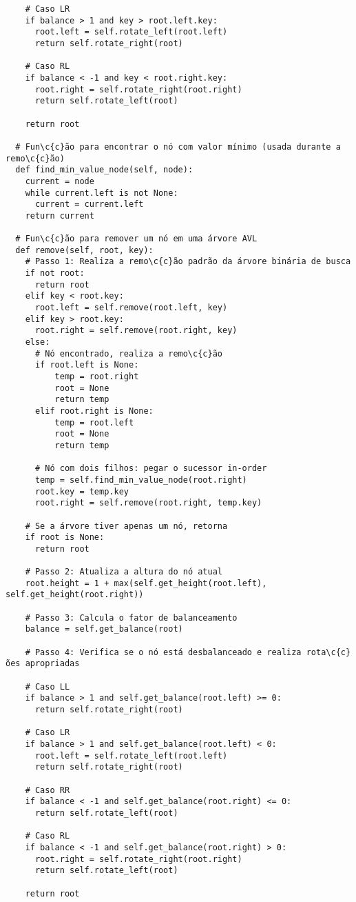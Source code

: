 \documentclass{article}
\begin{document}
\begin{lstlisting}
    # Caso LR
    if balance > 1 and key > root.left.key:
      root.left = self.rotate_left(root.left)
      return self.rotate_right(root)

    # Caso RL
    if balance < -1 and key < root.right.key:
      root.right = self.rotate_right(root.right)
      return self.rotate_left(root)

    return root

  # Fun\c{c}ão para encontrar o nó com valor mínimo (usada durante a remo\c{c}ão)
  def find_min_value_node(self, node):
    current = node
    while current.left is not None:
      current = current.left
    return current

  # Fun\c{c}ão para remover um nó em uma árvore AVL
  def remove(self, root, key):
    # Passo 1: Realiza a remo\c{c}ão padrão da árvore binária de busca
    if not root:
      return root
    elif key < root.key:
      root.left = self.remove(root.left, key)
    elif key > root.key:
      root.right = self.remove(root.right, key)
    else:
      # Nó encontrado, realiza a remo\c{c}ão
      if root.left is None:
          temp = root.right
          root = None
          return temp
      elif root.right is None:
          temp = root.left
          root = None
          return temp

      # Nó com dois filhos: pegar o sucessor in-order
      temp = self.find_min_value_node(root.right)
      root.key = temp.key
      root.right = self.remove(root.right, temp.key)

    # Se a árvore tiver apenas um nó, retorna
    if root is None:
      return root

    # Passo 2: Atualiza a altura do nó atual
    root.height = 1 + max(self.get_height(root.left), self.get_height(root.right))

    # Passo 3: Calcula o fator de balanceamento
    balance = self.get_balance(root)

    # Passo 4: Verifica se o nó está desbalanceado e realiza rota\c{c}ões apropriadas

    # Caso LL
    if balance > 1 and self.get_balance(root.left) >= 0:
      return self.rotate_right(root)

    # Caso LR
    if balance > 1 and self.get_balance(root.left) < 0:
      root.left = self.rotate_left(root.left)
      return self.rotate_right(root)

    # Caso RR
    if balance < -1 and self.get_balance(root.right) <= 0:
      return self.rotate_left(root)

    # Caso RL
    if balance < -1 and self.get_balance(root.right) > 0:
      root.right = self.rotate_right(root.right)
      return self.rotate_left(root)

    return root

\end{lstlisting}
\end{document}
